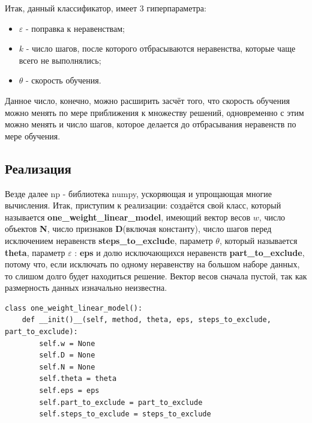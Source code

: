 \documentclass[a4paper]{article}
\begin{document}
Итак, данный классификатор, имеет 3 гиперпараметра: 
\begin{itemize}
\item $\varepsilon$ - поправка к неравенствам;
\item $k$ - число шагов, после которого отбрасываются неравенства, которые чаще всего не выполнялись;
\item $\theta$ - скорость обучения.
\end{itemize}

Данное число, конечно, можно расширить засчёт того, что скорость обучения можно менять по мере приближения к множеству решений, одновременно с этим можно менять и число шагов, которое делается до отбрасывания неравенств по мере обучения.
\subsection{Реализация}
Везде далее np - библиотека numpy, ускоряющая и упрощающая многие вычисления. Итак, приступим к реализации: создаётся свой класс, который называется \textbf{one\_weight\_linear\_model}, имеющий вектор весов $w$, число объектов \textbf{N}, число признаков \textbf{D}(включая константу), число шагов перед исключением неравенств \textbf{steps\_to\_exclude}, параметр $\theta$, который называется \textbf{theta}, параметр $\varepsilon$ : \textbf{eps} и долю исключающихся неравенств \textbf{part\_to\_exclude}, потому что, если исключать по одному неравенству на большом наборе данных, то слишом долго будет находиться решение. Вектор весов сначала пустой, так как размерность данных изначально неизвестна.
\begin{lstlisting}
class one_weight_linear_model():
	def __init()__(self, method, theta, eps, steps_to_exclude, part_to_exclude):
		self.w = None
		self.D = None
		self.N = None
		self.theta = theta
		self.eps = eps
		self.part_to_exclude = part_to_exclude
		self.steps_to_exclude = steps_to_exclude
\end{lstlisting}
\end{document}
